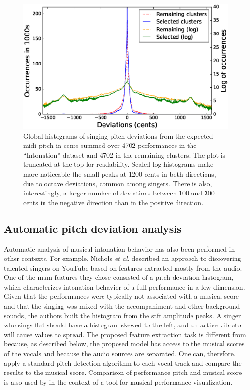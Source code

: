 \begin{figure}[h!]
    \centering
    \includegraphics[width=12cm]{figures/full_histograms_comparison.eps}
    \caption{Global histograms of singing pitch deviations from the expected \gls{midi} pitch in cents summed over 4702 performances in the ``Intonation'' dataset and 4702 in the remaining clusters. The plot is truncated at the top for readability. Scaled log histograms make more noticeable the small peaks at 1200 cents in both directions, due to octave deviations, common among singers. There is also, interestingly, a larger number of deviations between 100 and 300 cents in the negative direction than in the positive direction.}
    \label{fig:full_hist}
\end{figure}

\subsection{Automatic pitch deviation analysis}
Automatic analysis of musical intonation behavior has also been performed in other contexts. For example, Nichols \textit{et al.} \cite{nichols2012automatically} described an approach to discovering talented singers on YouTube based on features extracted mostly from the audio. One of the main features they chose consisted of a pitch deviation histogram, which characterizes intonation behavior of a full performance in a low dimension. Given that the performances were typically not associated with a musical score and that the singing was mixed with the accompaniment and other background sounds, the authors built the histogram from the \gls{stft} amplitude peaks. A singer who sings flat should have a histogram skewed to the left, and an active vibrato will cause values to spread. The proposed feature extraction task is different from \cite{nichols2012automatically} because, as described below, the proposed model has access to the musical scores of the vocals and because the audio sources are separated. One can, therefore, apply a standard pitch detection algorithm to each vocal track and compare the results to the musical score. Comparison of performance pitch and musical score is also used by \cite{lim2010intune} in the context of a tool for musical performance visualization.



